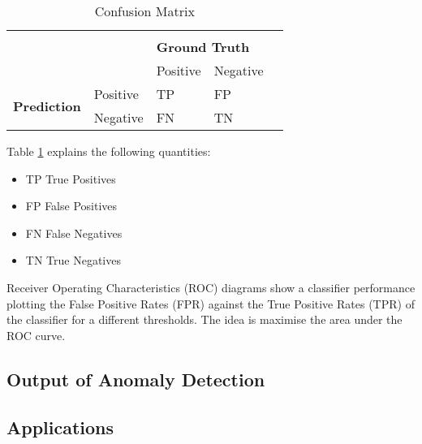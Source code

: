 \begin{table}[]
	\centering
	\begin{tabular}{lllll}
		                                     &          &                                           &          & \\
		\multirow{2}{*}{}                    &          & \multicolumn{2}{l}{\textbf{Ground Truth}} &            \\
		                                     &          & Positive                                  & Negative & \\
		\multirow{2}{*}{\textbf{Prediction}} & Positive & TP                                        & FP       & \\
		                                     & Negative & FN                                        & TN       &
	\end{tabular}
	\caption{Confusion Matrix}
	\label{table:confusion_matrix}
\end{table}

Table \ref{table:confusion_matrix} explains the following quantities:

\begin{itemize}
	\item TP True Positives
	\item FP False Positives
	\item FN False Negatives
	\item TN True Negatives
\end{itemize}

Receiver Operating Characteristics (ROC) diagrams show a classifier performance plotting the False Positive Rates (FPR) against the True Positive Rates (TPR) of the classifier for a different thresholds. The idea is maximise the area under the ROC curve.

\subsection{Output of Anomaly Detection}

\subsection{Applications}


